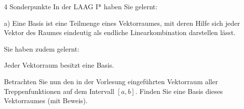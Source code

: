 \documentclass{problemset}
\begin{document}
\begin{problem}{4 Sonderpunkte}
In der LAAG I* haben Sie gelernt:

a) Eine Basis ist eine Teilmenge eines Vektorraumes, mit deren Hilfe sich jeder
Vektor des Raumes eindeutig als endliche Linearkombination darstellen lässt.

Sie haben zudem gelernt:

Jeder Vektorraum besitzt eine Basis.

Betrachten Sie nun den in der Vorlesung eingeführten Vektorraum aller
Treppenfunktionen auf dem Intervall $[a, b]$. Finden Sie eine Basis dieses
Vektorraumes (mit Beweis).
\end{problem}
\end{document}
